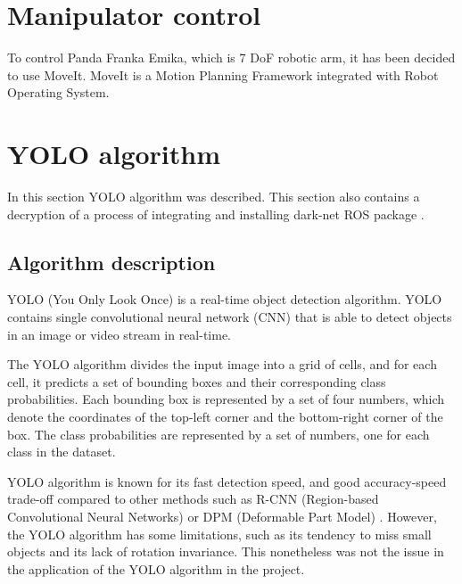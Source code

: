 \documentclass[conference,a4paper]{IEEEtran}
\begin{document}
\section{Manipulator control}
To control Panda Franka Emika, which is 7 DoF robotic arm, it has been decided to use MoveIt. MoveIt is a Motion Planning Framework integrated with Robot Operating System. 



\section{YOLO algorithm}
In this section YOLO algorithm was described. This section also contains a decryption of a process of integrating and installing dark-net ROS package \cite{YOLO_ROS}.

\subsection{Algorithm description}
YOLO (You Only Look Once) is a real-time object detection algorithm. YOLO contains single convolutional neural network (CNN) that is able to detect objects in an image or video stream in real-time. 

The YOLO algorithm divides the input image into a grid of cells, and for each cell, it predicts a set of bounding boxes and their corresponding class probabilities. Each bounding box is represented by a set of four numbers, which denote the coordinates of the top-left corner and the bottom-right corner of the box. The class probabilities are represented by a set of numbers, one for each class in the dataset.

YOLO algorithm is known for its fast detection speed, and good accuracy-speed trade-off compared to other methods such as R-CNN (Region-based Convolutional Neural Networks) or DPM (Deformable Part Model) \cite{YOLO_paper}. However, the YOLO algorithm has some limitations, such as its tendency to miss small objects and its lack of rotation invariance. This nonetheless was not the issue in the application of the YOLO algorithm in the project. 
\end{document}
